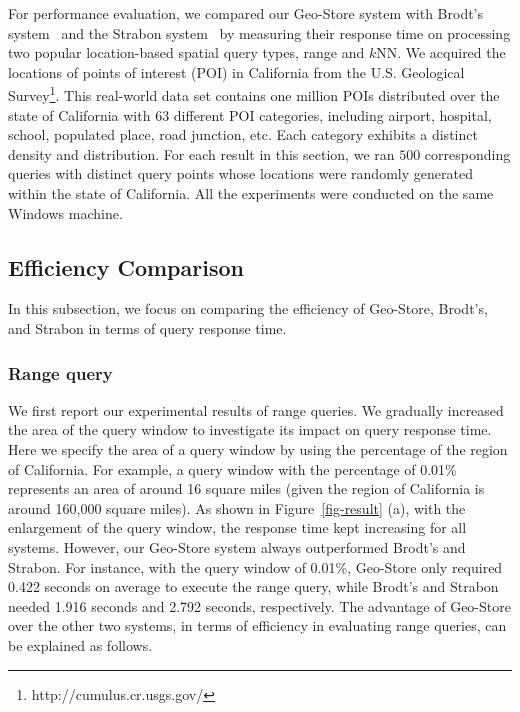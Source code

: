 
For performance evaluation, we compared our Geo-Store system with
Brodt's system~\cite{conf/gis/BrodtNM10} and the Strabon
system~\cite{KyzirakosKK10} by measuring their response time on
processing two popular location-based spatial query types, range
and $k$NN. We acquired the locations of points of interest (POI)
in California from the U.S. Geological
Survey\footnote{http://cumulus.cr.usgs.gov/}. This real-world data
set contains one million POIs distributed over the state of
California with 63 different POI categories, including airport,
hospital, school, populated place, road junction, etc. Each
category exhibits a distinct density and distribution. For each
result in this section, we ran $500$ corresponding queries with
distinct query points whose locations were randomly generated
within the state of California. All the experiments were conducted
on the same Windows machine.


\subsection{Efficiency Comparison}

In this subsection, we focus on comparing the efficiency of
Geo-Store, Brodt's, and Strabon in terms of query response time.

\subsubsection{Range query}

We first report our experimental results of range queries. We
gradually increased the area of the query window to investigate
its impact on query response time. Here we specify the area of a
query window by using the percentage of the region of California.
For example, a query window with the percentage of 0.01\%
represents an area of around 16 square miles (given the region of
California is around 160,000 square miles). As shown in
Figure~\ref{fig-result} (a), with the enlargement of the query
window, the response time kept increasing for all systems.
However, our Geo-Store system always outperformed Brodt's and
Strabon. For instance, with the query window of 0.01\%, Geo-Store
only required 0.422 seconds on average to execute the range query,
while Brodt's and Strabon needed 1.916 seconds and 2.792 seconds,
respectively. The advantage of Geo-Store over the other two
systems, in terms of efficiency in evaluating range queries, can
be explained as follows.

